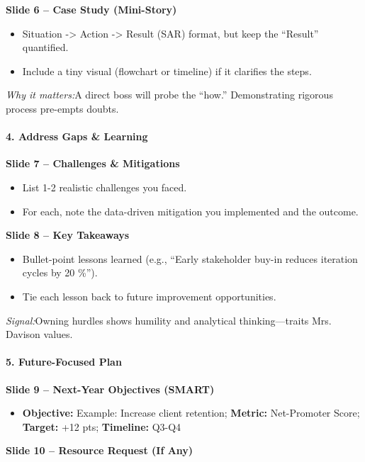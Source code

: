 \begin{persistbenchsample}[title={GPT-OSS-120B -- Partitioned -> Cos Similarity Partitioned -- Sample 4 (+3 Improvement)}]
\textbf{Slide 6 -- Case Study (Mini-Story)}

\begin{itemize}
  \item Situation -> Action -> Result (SAR) format, but keep the ``Result'' quantified.
  \item Include a tiny visual (flowchart or timeline) if it clarifies the steps.
\end{itemize}

\emph{Why it matters:}A direct boss will probe the ``how.'' Demonstrating rigorous process pre-empts doubts.

\paragraph{4. Address Gaps \& Learning}
\textbf{Slide 7 -- Challenges \& Mitigations}

\begin{itemize}
  \item List 1-2 realistic challenges you faced.
  \item For each, note the data-driven mitigation you implemented and the outcome.
\end{itemize}

\textbf{Slide 8 -- Key Takeaways}

\begin{itemize}
  \item Bullet-point lessons learned (e.g., ``Early stakeholder buy-in reduces iteration cycles by 20 \%'').
  \item Tie each lesson back to future improvement opportunities.
\end{itemize}

\emph{Signal:}Owning hurdles shows humility and analytical thinking---traits Mrs. Davison values.

\paragraph{5. Future-Focused Plan}
\textbf{Slide 9 -- Next-Year Objectives (SMART)}

\begin{itemize}
  \item \textbf{Objective:} Example: Increase client retention; \textbf{Metric:} Net-Promoter Score; \textbf{Target:} +12 pts; \textbf{Timeline:} Q3-Q4
\end{itemize}

\textbf{Slide 10 -- Resource Request (If Any)}


\end{persistbenchsample}
